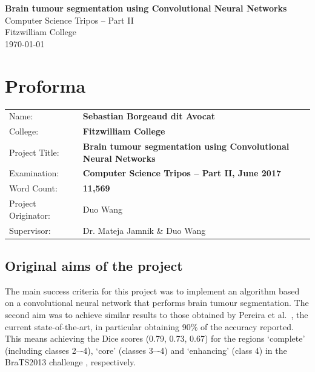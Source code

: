 \documentclass[12pt,a4paper,twoside,openright]{report}
\begin{document}





\pagestyle{empty}


\vspace*{60mm}
\begin{center}
\Huge
\textbf{Brain tumour segmentation using Convolutional Neural Networks} \\[5mm]
Computer Science Tripos -- Part II \\[5mm]
Fitzwilliam College \\[5mm]
\today  %
\end{center}


\pagestyle{plain}

\chapter*{Proforma}

{\large
\begin{tabular}{lp{12cm}}
Name:               & \bf Sebastian Borgeaud dit Avocat                       \\
College:            & \bf Fitzwilliam College                     \\
Project Title:      & \bf Brain tumour segmentation using Convolutional Neural Networks\\
Examination:        & \bf Computer Science Tripos -- Part II, June 2017  \\
Word Count:         & \bf 11,569  \\
Project Originator: & Duo Wang                    \\
Supervisor:         & Dr. Mateja Jamnik \& Duo Wang                    \\ 
\end{tabular}
}
\section*{Original aims of the project}
The main success criteria for this project was to implement an algorithm based on a convolutional neural network that performs brain tumour segmentation. The second aim was to achieve similar results to those obtained by Pereira et al.\ \cite{pereira}, the current state-of-the-art, in particular obtaining 90\% of the accuracy reported. This means achieving the Dice scores (0.79, 0.73, 0.67) for the regions `complete' (including classes 2–-4), ‘core’ (classes 3–-4) and ‘enhancing’ (class 4) in the BraTS2013 challenge \cite{brats-proceedings}, respectively.
\end{document}
